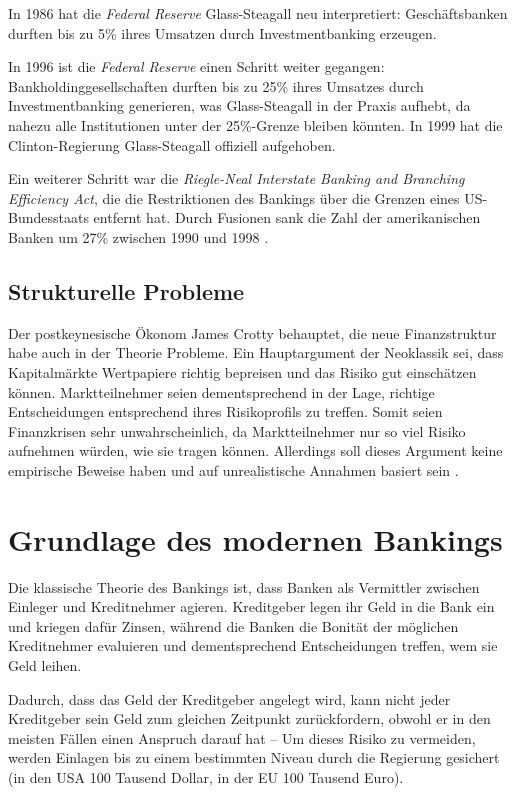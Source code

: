 \documentclass[a4paper,11pt]{report}
\begin{document}
In 1986 hat die \textit{Federal Reserve} Glass-Steagall neu interpretiert:
Geschäftsbanken durften bis zu 5\% ihres Umsatzen durch Investmentbanking
erzeugen.

In 1996 ist die \textit{Federal Reserve} einen Schritt weiter gegangen:
Bankholdinggesellschaften durften bis zu 25\% ihres Umsatzes durch
Investmentbanking generieren, was Glass-Steagall in der Praxis aufhebt,
da nahezu alle Institutionen unter der 25\%-Grenze bleiben k\"onnten.
In 1999 hat die Clinton-Regierung Glass-Steagall offiziell aufgehoben.

Ein weiterer Schritt war die \textit{
  Riegle-Neal  Interstate  Banking  and  Branching Efficiency Act}, die
die Restriktionen des Bankings \"uber die Grenzen eines US-Bundesstaats
entfernt hat. Durch Fusionen sank die Zahl der amerikanischen 
Banken um 27\% zwischen 1990 und 1998 \parencite[8--12]{sherman2009short}.

\subsection{Strukturelle Probleme}
Der postkeynesische \"Okonom James Crotty behauptet, die neue Finanzstruktur
habe auch in der Theorie Probleme. Ein Hauptargument der Neoklassik sei, dass
Kapitalm\"arkte Wertpapiere richtig bepreisen und das Risiko gut einsch\"atzen
k\"onnen. Marktteilnehmer seien dementsprechend in der Lage,
richtige Entscheidungen entsprechend ihres Risikoprofils zu treffen.
Somit seien Finanzkrisen sehr unwahrscheinlich, da Marktteilnehmer nur so viel
Risiko aufnehmen w\"urden, wie sie tragen k\"onnen. Allerdings soll dieses Argument
keine empirische Beweise haben und auf unrealistische Annahmen basiert sein 
\parencite[563--565]{crottycam}.

\section{Grundlage des modernen Bankings}
Die klassische Theorie des Bankings ist, dass Banken als Vermittler
zwischen Einleger und Kreditnehmer agieren. Kreditgeber legen ihr Geld
in die Bank ein und kriegen daf\"ur Zinsen, w\"ahrend die Banken die
Bonit\"at der m\"oglichen Kreditnehmer evaluieren und dementsprechend
Entscheidungen treffen, wem sie Geld leihen.

Dadurch, dass das Geld der Kreditgeber angelegt wird, kann nicht jeder
Kreditgeber sein Geld zum gleichen Zeitpunkt zur\"uckfordern, obwohl er
in den meisten F\"allen einen Anspruch darauf hat -- Um dieses Risiko
zu vermeiden, werden Einlagen bis zu einem bestimmten Niveau durch
die Regierung gesichert (in den USA 100 Tausend Dollar, in der EU 100 Tausend Euro).
\end{document}
